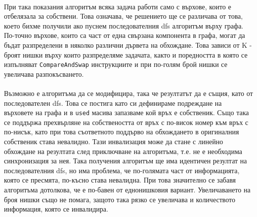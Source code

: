 \paragraph*{} При така показания алгоритъм всяка задача работи само с върхове, които е отбелязала за собствени. Това означава, че  решението ще се различава от това, което бихме получили ако пуснем последователния dfs алгоритъм върху графа. По-точно върхове, които са част от една свързана компонента в графа, могат да бъдат разпределени в няколко различни дървета на обхождане. Това зависи от K - броят нишки върху които разпределяме задачата, както и поредността в която се изпълняват \verb|CompareAndSwap| инструкциите и при по-голям брой нишки се увеличава разпокъсването.

\paragraph*{} Възможно е алгоритъма да се модифицира, така че резултатът да е същия, като от последователен dfs. Това се постига като си дефинираме подреждане на върховете на графа и в \verb|used| масива запазваме кой връх е собственик. Също така се поддържа прехвърляне на собствеността от връх с по-висок номер към връх с по-нисък, като при това съответното поддърво на обхождането в оригиналния собственик става невалидно. Тази инвализация може да стане с линейно обхождане на резултата след приключване на алгоритъма, т.е. не е необходима синхронизация за нея. Така получения алгоритъм ще има идентичен резултат на последователния dfs, но има проблема, че по-голямата част от информацията, която се пресмята, по-късно става невалидна. При това значително се забавя алгоритъма дотолкова, че е по-бавен от еднонишковия вариант. Увеличаването на броя нишки също не помага, защото така рязко се увеличава и количеството информация, която се инвалидира.
